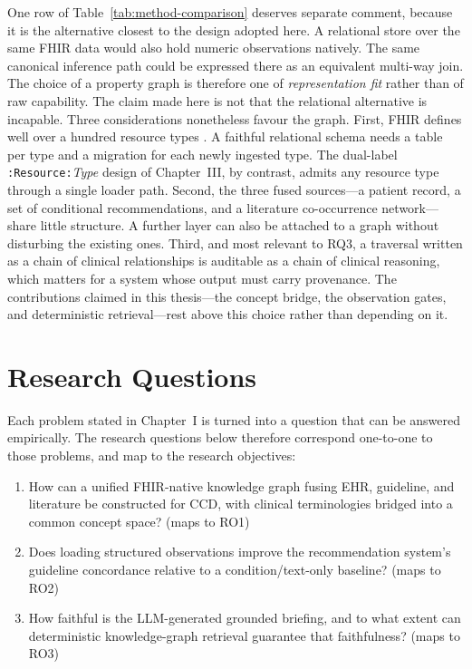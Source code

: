 One row of Table~\ref{tab:method-comparison} deserves separate comment, because it is the
alternative closest to the design adopted here. A relational store over the same FHIR data would also hold numeric observations natively.
The same canonical inference path could be expressed there as an equivalent multi-way join.
The choice of a property graph is therefore one of \emph{representation fit} rather than of
raw capability. The claim made here is not that the relational alternative is incapable. Three considerations nonetheless favour the graph.
First, FHIR defines well over a hundred resource types \cite{fhir_r4}. A faithful relational
schema needs a table per type and a migration for each newly ingested type. The dual-label
\texttt{:Resource:}\textit{Type} design of Chapter~III, by contrast, admits any resource
type through a single loader path. Second, the three fused sources---a patient record, a set
of conditional recommendations, and a literature co-occurrence network---share little
structure. A further layer can also be attached to a graph without disturbing the existing
ones. Third,
and most relevant to RQ3, a traversal written as a chain of clinical relationships is
auditable as a chain of clinical reasoning, which matters for a system whose output must carry
provenance. The contributions claimed in this thesis---the concept bridge, the observation
gates, and deterministic retrieval---rest above this choice rather than depending on it.

\section{Research Questions}

Each problem stated in Chapter~I is turned into a question that can be answered
empirically. The research questions below therefore correspond one-to-one to those
problems, and map to the research objectives:

\begin{enumerate}
    \item[RQ1.] How can a unified FHIR-native knowledge graph fusing EHR, guideline, and
    literature be constructed for CCD, with clinical terminologies bridged into a common
    concept space? (maps to RO1)
    \item[RQ2.] Does loading structured observations improve the recommendation system's
    guideline concordance relative to a condition/text-only baseline? (maps to RO2)
    \item[RQ3.] How faithful is the LLM-generated grounded briefing, and to what extent can
    deterministic knowledge-graph retrieval guarantee that faithfulness? (maps to RO3)
\end{enumerate}
